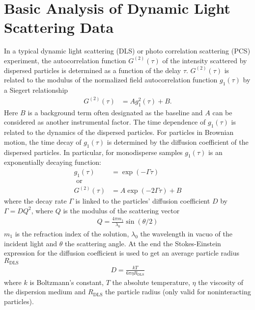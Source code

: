 
\chapter{Basic Analysis of Dynamic Light Scattering Data}
\label{basicDLS}
In a typical dynamic light scattering (DLS) or photo correlation scattering (PCS)
experiment, the autocorrelation function $G^{(2)}(\tau)$ of the intensity scattered
by dispersed particles is determined as a function of the delay $\tau$. $G^{(2)}(\tau)$
is related to the modulus of the normalized field autocorrelation function $g_1(\tau)$
by a Siegert relationship
\begin{align}
G^{(2)}(\tau) & = A g^2_1(\tau)  + B.
\end{align}
Here $B$ is a background term often designated as the baseline and $A$ can be considered
as another instrumental factor. The time dependence of $g_1(\tau)$ is related to the
dynamics of the dispersed particles. For particles in Brownian motion, the time decay of
$g_1(\tau)$ is determined by the diffusion coefficient of the dispersed particles. In particular,
for monodisperse samples $g_1(\tau)$ is an exponentially decaying function:
\begin{align}
g_1(\tau) & = \exp(-\Gamma\tau) \label{g1}\\
\text{ or } & \nonumber \\
G^{(2)}(\tau)  & = A \exp(-2\Gamma\tau) + B
\label{G2}
\end{align}
where the decay rate $\Gamma$ is linked to the particles' diffusion coefficient $D$
by $\Gamma=D Q^2$, where $Q$ is the modulus of the scattering vector
\begin{align}
Q = \frac{4\pi m_1}{\lambda_0} \sin(\theta/2)
\end{align}
$m_1$ is the refraction index of the solution, $\lambda_0$ the wavelength in vacuo
of the incident light and $\theta$ the scattering angle. At the end the Stokes-Einstein
expression for the diffusion coefficient is used to get an average particle radius
$R_\text{DLS}$
\begin{align}
D = \frac{kT}{6\pi\eta R_\text{DLS}}
\label{DiffRDLS}
\end{align}
where $k$ is Boltzmann's constant, $T$ the absolute temperature, $\eta$ the viscosity
of the dispersion medium and $R_\text{DLS}$ the particle radius (only valid for noninteracting
particles).

\newpage

